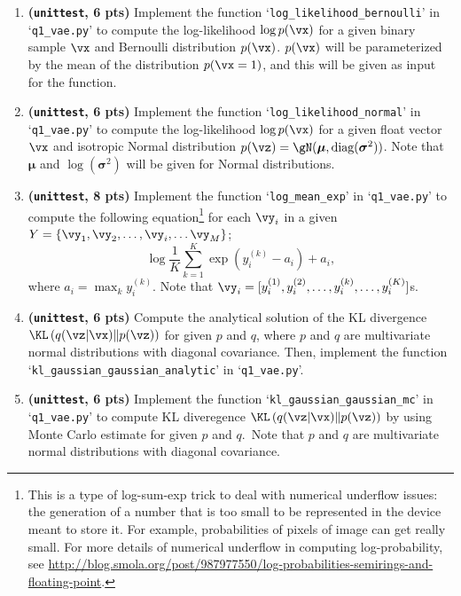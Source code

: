 \documentclass[12pt]{article}
\theoremstyle{definition}
\begin{document}
\begin{enumerate}
\item \textbf{(\texttt{unittest}, 6 pts)} Implement the function `{\tt log\_likelihood\_bernoulli}' in `{\tt q1\_vae.py}' to compute the log-likelihood $\log p(\vx)$ for a given binary sample $\vx$ and Bernoulli distribution $p(\vx)$. $p(\vx)$ will be parameterized by the mean of the distribution $p(\vx=1)$, and this will be given as input for the function.

\item \textbf{(\texttt{unittest}, 6 pts)} Implement the function `{\tt log\_likelihood\_normal}' in `{\tt q1\_vae.py}' to compute the log-likelihood $\log p(\vx)$ for a given float vector $\vx$ and isotropic Normal distribution $p(\vz)=\gN(\bm{\mu}, \textrm{diag}(\bm{\sigma}^2))$. Note that $\bm{\mu}$ and $\log(\bm{\sigma}^2)$ will be given for Normal distributions.

\item \textbf{(\texttt{unittest}, 8 pts)} Implement the function `{\tt log\_mean\_exp}' in `{\tt q1\_vae.py}' to compute the following equation\footnote{
This is a type of log-sum-exp trick to deal with numerical underflow issues: the generation of a number that is too small to be represented in the device meant to store it. For example, probabilities of pixels of image can get really small. For more details of numerical underflow in computing log-probability, see \url{http://blog.smola.org/post/987977550/log-probabilities-semirings-and-floating-point}.} for each $\vy_i$ in a given $Y=\{\vy_1, \vy_2, \dots, \vy_i, \dots \vy_M\}$;
$$
\log \frac{1}{K} \sum_{k=1}^{K} \exp \left( y_i^{(k)} - a_i \right) + a_i,
$$
where $a_i = \max_{k} y_i^{(k)}$. Note that $\vy_i = [y_i^{(1)}, y_i^{(2)}, \dots, y_i^{(k)}, \dots, y_i^{(K)}]$s.

\item \textbf{(\texttt{unittest}, 6 pts)}
Compute the analytical solution of the KL divergence $\KL \left( q(\vz | \vx) \middle\Vert p(\vz) \right)$ for given $p$ and $q$, where $p$ and $q$ are multivariate normal distributions with diagonal covariance.
Then, implement the function `{\tt kl\_gaussian\_gaussian\_analytic}' in `{\tt q1\_vae.py}'.

\item \textbf{(\texttt{unittest}, 6 pts)} Implement the function `{\tt kl\_gaussian\_gaussian\_mc}' in `{\tt q1\_vae.py}' to compute KL diveregence $\KL \left( q(\vz | \vx) \middle\Vert p(\vz) \right)$ by using Monte Carlo estimate for given $p$ and $q$.~Note that $p$ and $q$ are multivariate normal distributions with diagonal covariance.


\end{enumerate}
\end{document}
